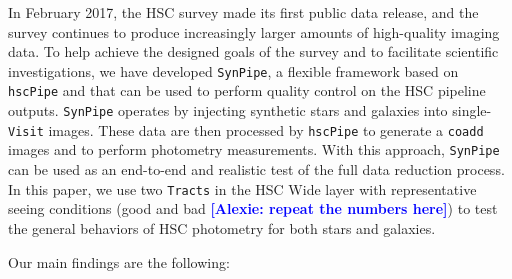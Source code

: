 \documentclass[useamsfonts]{pasj01}
\newcommand{\alexie}[1]{\textcolor{blue}{\textbf{[Alexie: #1]}}}
\def\hscpipe{\texttt{hscPipe}}
\def\synpipe{\texttt{SynPipe}}
\def\coadd{\texttt{coadd}}
\def\visit{\texttt{Visit}}
\def\tracts{\texttt{Tracts}}
\begin{document}
    In February 2017, the HSC survey made its first public data release, and the survey 
    continues to produce increasingly larger amounts of high-quality imaging data.
    To help achieve the designed goals of the survey and to facilitate scientific investigations, we have developed \synpipe{}, a flexible framework based on
    \hscpipe{} and that can be used to perform quality control on the 
    HSC pipeline outputs. \synpipe{} operates by injecting synthetic stars and galaxies into single-\visit{} images. 
    These data are then processed by \hscpipe{} to generate a \coadd{} images and to perform photometry measurements. With this  approach,  \synpipe{} can be used as an end-to-end and realistic test of the full  data reduction process. In this paper, we  use  two \tracts{} in the HSC Wide layer with
    representative seeing conditions (good and bad \alexie{repeat the numbers here}) to test the general behaviors of HSC
    photometry for both stars and galaxies.

    Our main findings are the following:
\end{document}
